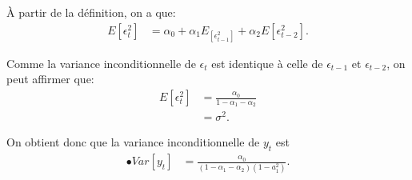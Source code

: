 \documentclass{article}
\begin{document}
À partir de la définition, on a que:
\begin{align*}
E[\epsilon_t^2] &= \alpha_0 + \alpha_1 E_[\epsilon_{t-1}^2] + \alpha_2 E[\epsilon_{t-2}^2].
\end{align*}

Comme la variance inconditionnelle de $\epsilon_t$ est identique à celle de $\epsilon_{t-1}$ et $\epsilon_{t-2}$, on peut affirmer que:
\begin{align*}
E[\epsilon_t^2] &= \frac{\alpha_0}{1-\alpha_1-\alpha_2} \\
&= \sigma^2.
\end{align*}

On obtient donc que la variance inconditionnelle de $y_t$ est
\begin{align*}
•Var[y_t] &= \frac{\alpha_0}{(1-\alpha_1-\alpha_2)(1-a_1^2)}.
\end{align*}

\clearpage

\end{document}
